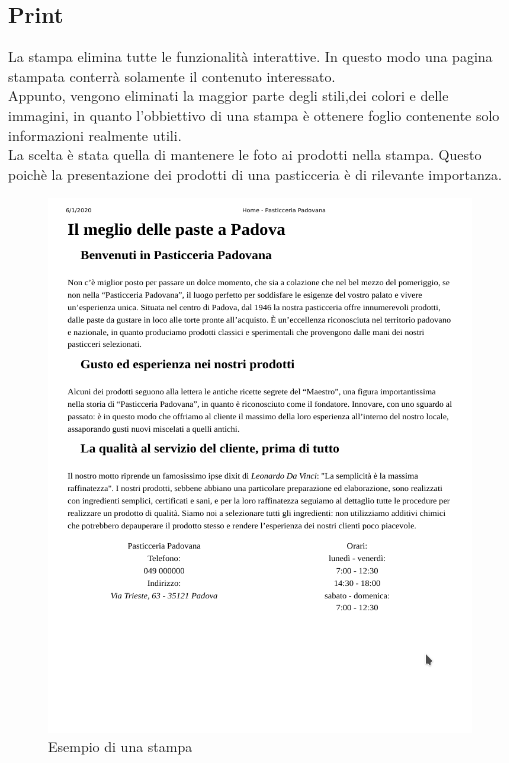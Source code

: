\subsection{Print}
La stampa elimina tutte le funzionalità interattive. In questo modo una pagina stampata conterrà solamente il contenuto interessato.\\
Appunto, vengono eliminati la maggior parte degli stili,dei colori e delle immagini, in quanto l'obbiettivo di una stampa è ottenere foglio 
contenente solo informazioni realmente utili.\\
La scelta è stata quella di mantenere le foto ai prodotti nella stampa. Questo poichè la presentazione dei prodotti di una pasticceria è di rilevante importanza.\\
\begin{figure}[!h]
    \centering		  
	\includegraphics[width=0.8\linewidth]{sezioni/Progettazione/Immagini/print_example.png}
	\caption{Esempio di una stampa}
	\label{Fig:verPrint}
\end{figure}


\newpage